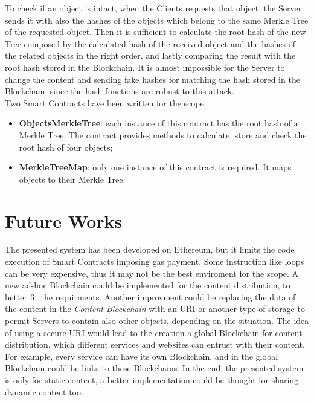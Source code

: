 \documentclass[hidelinks,conference,compsoc]{IEEEtran}
\begin{document}
To check if an object is intact, when the Clients requests that object, the Server sends it with also the hashes of the objects which belong to the same Merkle Tree of the requested object. Then it is sufficient to calculate the root hash of the new Tree composed by the calculated hash of the received object and the hashes of the related objects in the right order, and lastly comparing the result with the root hash stored in the Blockchain. It is almost impossible for the Server to change the content and sending fake hashes for matching the hash stored in the Blockchain, since the hash functions are robust to this attack.\\
Two Smart Contracts have been written for the scope:
\begin{itemize}
	\item \textbf{ObjectsMerkleTree}: each instance of this contract has the root hash of a Merkle Tree. The contract provides methods to calculate, store and check the root hash of four objects;
	\item \textbf{MerkleTreeMap}: only one instance of this contract is required. 
	It maps objects to their Merkle Tree.
\end{itemize}


\section{Future Works}

The presented system has been developed on Ethereum, but it limits the code execution of Smart Contracts imposing gas payment. Some instruction like loops can be very expensive, thus it may not be the best enviroment for the scope. A new ad-hoc Blockchain could be implemented for the content distribution, to better fit the requirments. 
Another improvment could be replacing the data of the content in the \textit{Content Blockchain} with an URI or another type of storage to permit Servers to contain also other objects, depending on the situation.
The idea of using a secure URI would lead to the creation a global Blockchain for content distribution, which different services and websites can entrust with their content. For example, every service can have its own Blockchain, and in the global Blockchain could be links to these Blockchains.
In the end, the presented system is only for static content, a better implementation could be thought for sharing dynamic content too.
\end{document}
